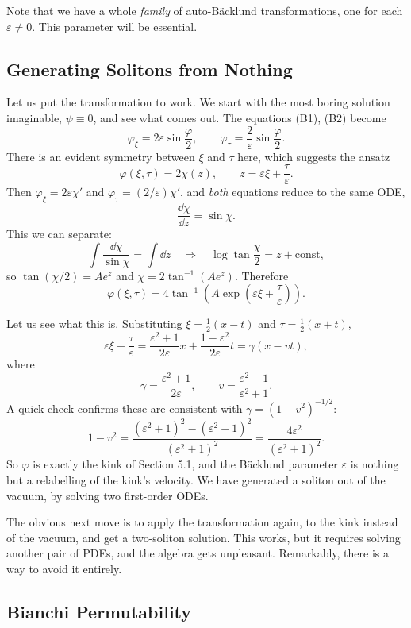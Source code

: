 Note that we have a whole \emph{family} of auto-B\"acklund transformations, one for each $\varepsilon\neq 0$. This parameter will be essential.

\subsection{Generating Solitons from Nothing}

Let us put the transformation to work. We start with the most boring solution imaginable, $\psi \equiv 0$, and see what comes out. The equations (B1), (B2) become
$$
\varphi_\xi = 2\varepsilon\sin\frac{\varphi}{2}, \qquad \varphi_\tau = \frac{2}{\varepsilon}\sin\frac{\varphi}{2}.
$$
There is an evident symmetry between $\xi$ and $\tau$ here, which suggests the ansatz
$$
\varphi(\xi,\tau) = 2\chi(z), \qquad z = \varepsilon\xi + \frac{\tau}{\varepsilon}.
$$
Then $\varphi_\xi = 2\varepsilon\chi'$ and $\varphi_\tau = (2/\varepsilon)\chi'$, and \emph{both} equations reduce to the same ODE,
$$
\frac{\dd\chi}{\dd z} = \sin\chi.
$$
This we can separate:
$$
\int\frac{\dd\chi}{\sin\chi} = \int\dd z \quad\Longrightarrow\quad \log\tan\frac{\chi}{2} = z + \text{const},
$$
so $\tan(\chi/2) = Ae^z$ and $\chi = 2\tan^{-1}(Ae^z)$. Therefore
$$
\varphi(\xi,\tau) = 4\tan^{-1}\left(A\exp\left(\varepsilon\xi + \frac{\tau}{\varepsilon}\right)\right).
$$

Let us see what this is. Substituting $\xi = \frac{1}{2}(x-t)$ and $\tau = \frac{1}{2}(x+t)$,
$$
\varepsilon\xi + \frac{\tau}{\varepsilon} = \frac{\varepsilon^2+1}{2\varepsilon}x + \frac{1-\varepsilon^2}{2\varepsilon}t = \gamma\left(x - vt\right),
$$
where
$$
\gamma = \frac{\varepsilon^2+1}{2\varepsilon}, \qquad v = \frac{\varepsilon^2-1}{\varepsilon^2+1}.
$$
A quick check confirms these are consistent with $\gamma = (1-v^2)^{-1/2}$:
$$
1 - v^2 = \frac{(\varepsilon^2+1)^2 - (\varepsilon^2-1)^2}{(\varepsilon^2+1)^2} = \frac{4\varepsilon^2}{(\varepsilon^2+1)^2}.
$$
So $\varphi$ is exactly the kink of Section 5.1, and the B\"acklund parameter $\varepsilon$ is nothing but a relabelling of the kink's velocity. We have generated a soliton out of the vacuum, by solving two first-order ODEs.

The obvious next move is to apply the transformation again, to the kink instead of the vacuum, and get a two-soliton solution. This works, but it requires solving another pair of PDEs, and the algebra gets unpleasant. Remarkably, there is a way to avoid it entirely.

\subsection{Bianchi Permutability}

